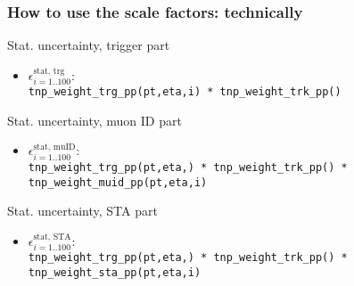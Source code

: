 \documentclass[10pt]{beamer}
\begin{document}
 \begin{frame}
  \frametitle{How to use the scale factors: technically}
  
  \begin{block}{Stat. uncertainty, trigger part}
  \begin{itemize}
   \item \alert{$\epsilon^\text{stat, trg}_{i=1..100}$}: \\\texttt{tnp\_weight\_trg\_pp(pt,eta,\alert{i}) * tnp\_weight\_trk\_pp()}
   \end{itemize}
  \end{block}
  
  \begin{block}{Stat. uncertainty, muon ID part}
  \begin{itemize}
   \item \alert{$\epsilon^\text{stat, muID}_{i=1..100}$}: \\\texttt{tnp\_weight\_trg\_pp(pt,eta,) * tnp\_weight\_trk\_pp() * tnp\_weight\_\alert{muid}\_pp(pt,eta,\alert{i})}
   \end{itemize}
  \end{block}
  
  \begin{block}{Stat. uncertainty, STA part}
  \begin{itemize}
   \item \alert{$\epsilon^\text{stat, STA}_{i=1..100}$}: \\\texttt{tnp\_weight\_trg\_pp(pt,eta,) * tnp\_weight\_trk\_pp() * tnp\_weight\_\alert{sta}\_pp(pt,eta,\alert{i})}
   \end{itemize}
  \end{block}

 \end{frame}
 
\end{document}
